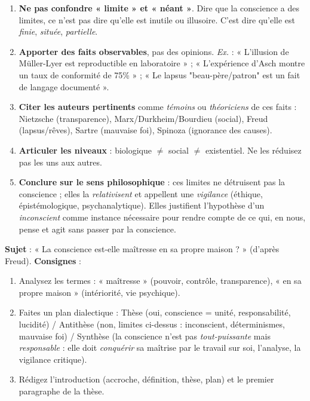 \documentclass[11pt]{article}
\begin{document}
\begin{methode}
\begin{enumerate}
    \item \textbf{Ne pas confondre « limite » et « néant »}. Dire que la conscience a des limites, ce n'est pas dire qu'elle est inutile ou illusoire. C'est dire qu'elle est \emph{finie}, \emph{située}, \emph{partielle}.
    \item \textbf{Apporter des faits observables}, pas des opinions. \emph{Ex.} : « L'illusion de Müller-Lyer est reproductible en laboratoire » ; « L'expérience d'Asch montre un taux de conformité de 75\% » ; « Le lapsus "beau-père/patron" est un fait de langage documenté ».
    \item \textbf{Citer les auteurs pertinents} comme \emph{témoins} ou \emph{théoriciens} de ces faits : Nietzsche (transparence), Marx/Durkheim/Bourdieu (social), Freud (lapsus/rêves), Sartre (mauvaise foi), Spinoza (ignorance des causes).
    \item \textbf{Articuler les niveaux} : biologique $\neq$ social $\neq$ existentiel. Ne les réduisez pas les uns aux autres.
    \item \textbf{Conclure sur le sens philosophique} : ces limites ne détruisent pas la conscience ; elles la \emph{relativisent} et appellent une \emph{vigilance} (éthique, épistémologique, psychanalytique). Elles justifient l'hypothèse d'un \emph{inconscient} comme instance nécessaire pour rendre compte de ce qui, en nous, pense et agit sans passer par la conscience.
\end{enumerate}
\end{methode}

\begin{exercice}
\textbf{Sujet} : « La conscience est-elle maîtresse en sa propre maison ? » (d'après Freud).
\textbf{Consignes} :
\begin{enumerate}
    \item Analysez les termes : « maîtresse » (pouvoir, contrôle, transparence), « en sa propre maison » (intériorité, vie psychique).
    \item Faites un plan dialectique : Thèse (oui, conscience = unité, responsabilité, lucidité) / Antithèse (non, limites ci-dessus : inconscient, déterminismes, mauvaise foi) / Synthèse (la conscience n'est pas \emph{tout-puissante} mais \emph{responsable} : elle doit \emph{conquérir} sa maîtrise par le travail sur soi, l'analyse, la vigilance critique).
    \item Rédigez l'introduction (accroche, définition, thèse, plan) et le premier paragraphe de la thèse.
\end{enumerate}
\end{exercice}
\end{document}
